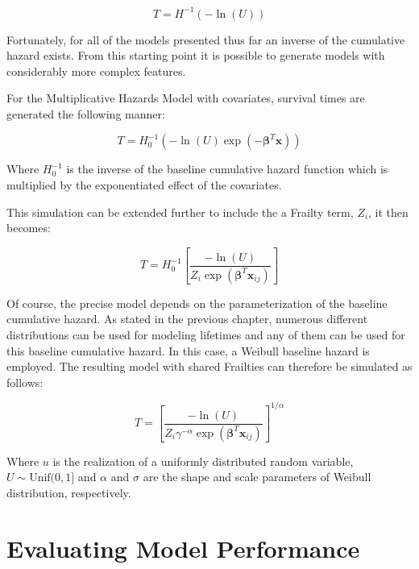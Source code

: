 $$ T = H^{-1}(-\ln(U)) $$

Fortunately, for all of the models presented thus far an inverse of the cumulative hazard exists. From this starting point it is possible to generate models with considerably more complex features.

For the Multiplicative Hazards Model with covariates, survival times are generated the following manner\cite{Bender2005}:

$$ T = H_0^{-1}(-\ln(U) \exp(-\boldsymbol\beta^T \textbf{x})) $$

Where $H_0^{-1}$ is the inverse of the baseline cumulative hazard function which is multiplied by the exponentiated effect of the covariates. 

This simulation can be extended further to include the a Frailty term, $Z_i$, it then becomes\cite{Romdhane2015}:

$$ T = H_0^{-1}\left [\frac{-\ln(U)}{Z_{i} \exp(\boldsymbol\beta^T \textbf{x}_{ij})}  \right ] $$




Of course, the precise model depends on the parameterization of the baseline cumulative hazard. As stated in the previous chapter, numerous different distributions can be used for modeling lifetimes and any of them can be used for this baseline cumulative hazard. In this case, a Weibull baseline hazard is employed. The resulting model with shared Frailties can therefore be simulated as follows:

$$T = \left [\frac{- \ln(U) }{Z_{i} \gamma^{-\alpha}  \exp(\boldsymbol\beta^T \textbf{x}_{ij})}  \right ]^{1/\alpha} $$

Where $u$ is the realization of a uniformly distributed random variable, $U \sim \text{Unif}(0,1]$ and $\alpha$ and $\sigma$ are the shape and scale parameters of Weibull distribution, respectively.



\section*{Evaluating Model Performance}

